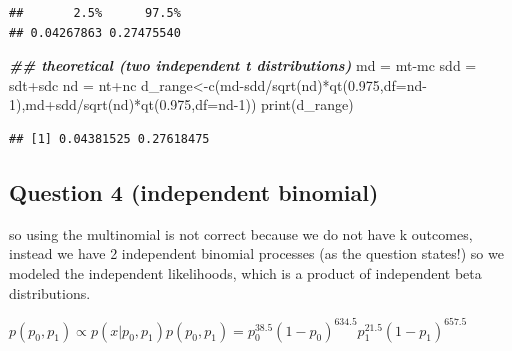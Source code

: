 \documentclass[
]{book}
\newenvironment{Shaded}{\begin{snugshade}}{\end{snugshade}}
\newcommand{\AttributeTok}[1]{\textcolor[rgb]{0.77,0.63,0.00}{#1}}
\newcommand{\DecValTok}[1]{\textcolor[rgb]{0.00,0.00,0.81}{#1}}
\newcommand{\DocumentationTok}[1]{\textcolor[rgb]{0.56,0.35,0.01}{\textbf{\textit{#1}}}}
\newcommand{\FloatTok}[1]{\textcolor[rgb]{0.00,0.00,0.81}{#1}}
\newcommand{\FunctionTok}[1]{\textcolor[rgb]{0.00,0.00,0.00}{#1}}
\newcommand{\NormalTok}[1]{#1}
\newcommand{\OtherTok}[1]{\textcolor[rgb]{0.56,0.35,0.01}{#1}}
\newcommand{\SpecialCharTok}[1]{\textcolor[rgb]{0.00,0.00,0.00}{#1}}
\theoremstyle{definition}
\theoremstyle{definition}
\theoremstyle{definition}
\theoremstyle{definition}
\theoremstyle{remark}
\begin{document}
\begin{verbatim}
##       2.5%      97.5% 
## 0.04267863 0.27475540
\end{verbatim}

\begin{Shaded}
\begin{Highlighting}[]
  \DocumentationTok{\#\# theoretical (two independent t distributions)}
\NormalTok{  md }\OtherTok{=}\NormalTok{ mt}\SpecialCharTok{{-}}\NormalTok{mc}
\NormalTok{  sdd }\OtherTok{=}\NormalTok{ sdt}\SpecialCharTok{+}\NormalTok{sdc}
\NormalTok{  nd }\OtherTok{=}\NormalTok{ nt}\SpecialCharTok{+}\NormalTok{nc}
\NormalTok{  d\_range}\OtherTok{\textless{}{-}}\FunctionTok{c}\NormalTok{(md}\SpecialCharTok{{-}}\NormalTok{sdd}\SpecialCharTok{/}\FunctionTok{sqrt}\NormalTok{(nd)}\SpecialCharTok{*}\FunctionTok{qt}\NormalTok{(}\FloatTok{0.975}\NormalTok{,}\AttributeTok{df=}\NormalTok{nd}\DecValTok{{-}1}\NormalTok{),md}\SpecialCharTok{+}\NormalTok{sdd}\SpecialCharTok{/}\FunctionTok{sqrt}\NormalTok{(nd)}\SpecialCharTok{*}\FunctionTok{qt}\NormalTok{(}\FloatTok{0.975}\NormalTok{,}\AttributeTok{df=}\NormalTok{nd}\DecValTok{{-}1}\NormalTok{))}
  \FunctionTok{print}\NormalTok{(d\_range)}
\end{Highlighting}
\end{Shaded}

\begin{verbatim}
## [1] 0.04381525 0.27618475
\end{verbatim}

\hypertarget{question-4-independent-binomial}{%
\subsection*{Question 4 (independent binomial)}\label{question-4-independent-binomial}}

so using the multinomial is not correct because we do not have k outcomes, instead we have 2 independent binomial processes (as the question states!) so we modeled the independent likelihoods, which is a product of independent beta distributions.

\(p(p_0,p_1) \propto p(x| p_0,p_1)p(p_0,p_1) = p_0^{38.5}(1-p_0)^{634.5}p_1^{21.5}(1-p_1)^{657.5}\)
\end{document}

